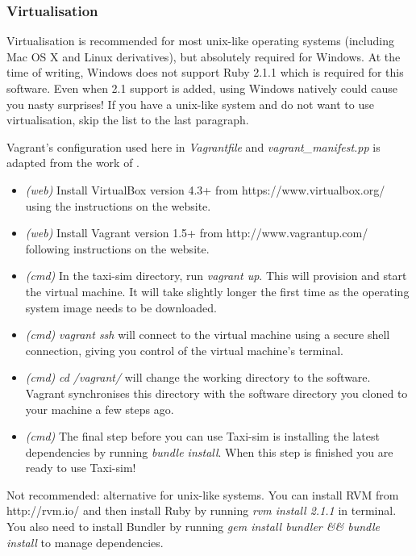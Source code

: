 \subsubsection{Virtualisation}
\label{sec:user_manual:installation:virtualisation}

Virtualisation is recommended for most unix-like operating systems (including
Mac OS X and Linux derivatives), but absolutely required for Windows. At the
time of writing, Windows does not support Ruby 2.1.1 which is required for this
software. Even when 2.1 support is added, using Windows natively could cause
you nasty surprises! If you have a unix-like system and do not want to use
virtualisation, skip the list to the last paragraph.

Vagrant's configuration used here in \textit{Vagrantfile} and
\textit{vagrant_manifest.pp} is adapted from the work of
\textcite{Rails+dev+box}.

\begin{itemize}
  \item \textit{(web)} Install VirtualBox version 4.3+
        \parencite{Virtualbox} from
        https://www.virtualbox.org/ using the instructions on the website.
  \item \textit{(web)} Install Vagrant version 1.5+ \parencite{Vagrant} from 
        http://www.vagrantup.com/ following instructions on the website.
  \item \textit{(cmd)} In the taxi-sim directory, run \textit{vagrant up}. This
        will provision and start the virtual machine. It will take slightly
        longer the first time as the operating system image needs to be
        downloaded.
  \item \textit{(cmd)} \textit{vagrant ssh} will connect to the virtual machine 
        using a secure shell connection, giving you control of the virtual
        machine's terminal.
  \item \textit{(cmd)} \textit{cd /vagrant/} will change the working
        directory to the software. Vagrant synchronises this directory with the
        software directory you cloned to your machine a few steps ago.
  \item \textit{(cmd)} The final step before you can use Taxi-sim is installing
        the latest dependencies by running \textit{bundle install}. When this
        step is finished you are ready to use Taxi-sim!
\end{itemize}

Not recommended: alternative for unix-like systems. You can install RVM
\parencite{Rvm} from http://rvm.io/ and then install Ruby by running
\textit{rvm install 2.1.1} in terminal. You also need to install Bundler
\parencite{Bundler} by running \textit{gem install bundler && bundle install}
to manage dependencies.


